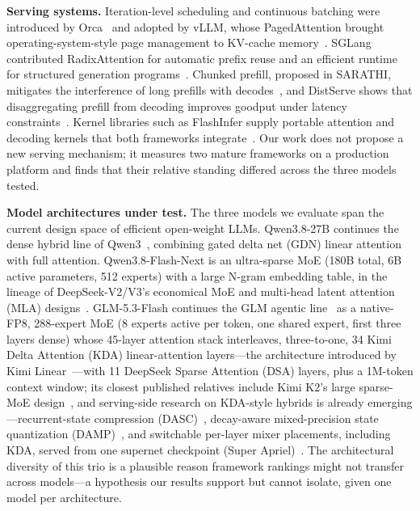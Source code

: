 \documentclass[11pt]{article}
\begin{document}
\textbf{Serving systems.} Iteration-level scheduling and continuous batching were introduced by Orca~\cite{yu2022orca} and adopted by vLLM, whose PagedAttention brought operating-system-style page management to KV-cache memory~\cite{kwon2023vllm}. SGLang contributed RadixAttention for automatic prefix reuse and an efficient runtime for structured generation programs~\cite{zheng2024sglang}. Chunked prefill, proposed in SARATHI, mitigates the interference of long prefills with decodes~\cite{agrawal2023sarathi}, and DistServe shows that disaggregating prefill from decoding improves goodput under latency constraints~\cite{zhong2024distserve}. Kernel libraries such as FlashInfer supply portable attention and decoding kernels that both frameworks integrate~\cite{ye2025flashinfer}. Our work does not propose a new serving mechanism; it measures two mature frameworks on a production platform and finds that their relative standing differed across the three models tested.

\textbf{Model architectures under test.} The three models we evaluate span the current design space of efficient open-weight LLMs. Qwen3.8-27B continues the dense hybrid line of Qwen3~\cite{yang2025qwen3}, combining gated delta net (GDN) linear attention with full attention. Qwen3.8-Flash-Next is an ultra-sparse MoE (180B total, 6B active parameters, 512 experts) with a large N-gram embedding table, in the lineage of DeepSeek-V2/V3's economical MoE and multi-head latent attention (MLA) designs~\cite{deepseek2024v3,deepseek2024v2}. GLM-5.3-Flash continues the GLM agentic line~\cite{glm2026glm5} as a native-FP8, 288-expert MoE (8 experts active per token, one shared expert, first three layers dense) whose 45-layer attention stack interleaves, three-to-one, 34 Kimi Delta Attention (KDA) linear-attention layers---the architecture introduced by Kimi Linear~\cite{kimi2025linear}---with 11 DeepSeek Sparse Attention (DSA) layers, plus a 1M-token context window; its closest published relatives include Kimi K2's large sparse-MoE design~\cite{kimi2025k2}, and serving-side research on KDA-style hybrids is already emerging---recurrent-state compression (DASC)~\cite{yu2026dasc}, decay-aware mixed-precision state quantization (DAMP)~\cite{zhang2026damp}, and switchable per-layer mixer placements, including KDA, served from one supernet checkpoint (Super Apriel)~\cite{slam2026superapriel}. The architectural diversity of this trio is a plausible reason framework rankings might not transfer across models---a hypothesis our results support but cannot isolate, given one model per architecture.
\end{document}
